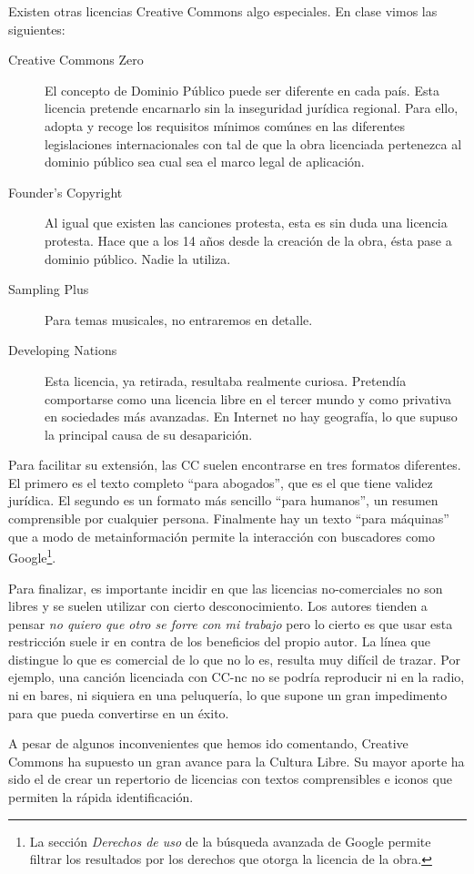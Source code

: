 Existen otras licencias Creative Commons algo especiales. En clase
vimos las siguientes:
\begin{description}
\item[Creative Commons Zero] El concepto de Dominio Público puede ser
  diferente en cada país. Esta licencia pretende encarnarlo sin la
  inseguridad jurídica regional. Para ello, adopta y recoge los requisitos
  mínimos comúnes en las diferentes legislaciones internacionales con tal de
  que la obra licenciada pertenezca al dominio público sea cual sea el marco
  legal de aplicación.
\item[Founder's Copyright] Al igual que existen las canciones
  protesta, esta es sin duda una licencia protesta. Hace que a los 14
  años desde la creación de la obra, ésta pase a dominio
  público. Nadie la utiliza.
\item[Sampling Plus] Para temas musicales, no entraremos en detalle.
\item[Developing Nations] Esta licencia, ya retirada, resultaba
  realmente curiosa. Pretendía comportarse como una licencia libre en
  el tercer mundo y como privativa en sociedades más avanzadas. En
  Internet no hay geografía, lo que supuso la principal causa de su
  desaparición.
\end{description}

Para facilitar su extensión, las CC suelen encontrarse en tres
formatos diferentes. El primero es el texto completo ``para
abogados'', que es el que tiene validez jurídica. El segundo es un
formato más sencillo ``para humanos'', un resumen comprensible por
cualquier persona. Finalmente hay un texto ``para máquinas'' que a
modo de metainformación permite la interacción con buscadores como
Google\footnote{La sección \emph{Derechos de uso} de la búsqueda
  avanzada de Google permite filtrar los resultados por los derechos
  que otorga la licencia de la obra.}.

Para finalizar, es importante incidir en que las licencias
no-comerciales no son libres y se suelen utilizar con cierto
desconocimiento. Los autores tienden a pensar \emph{no quiero que otro
  se forre con mi trabajo} pero lo cierto es que usar esta restricción
suele ir en contra de los beneficios del propio autor. La línea que
distingue lo que es comercial de lo que no lo es, resulta muy difícil de
trazar. Por ejemplo, una canción licenciada con CC-nc no se podría
reproducir ni en la radio, ni en bares, ni siquiera en una peluquería,
lo que supone un gran impedimento para que pueda convertirse en un
éxito. 

A pesar de algunos inconvenientes que hemos ido comentando, Creative
Commons ha supuesto un gran avance para la Cultura Libre. Su mayor
aporte ha sido el de crear un repertorio de licencias con textos
comprensibles e iconos que permiten la rápida identificación.
